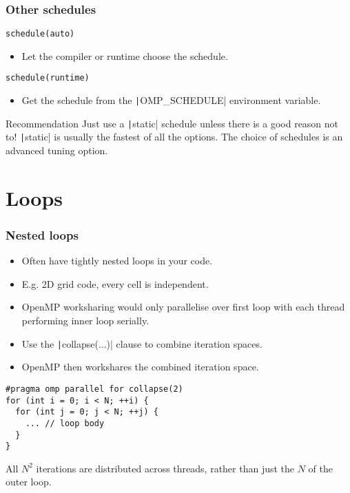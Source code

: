 \documentclass{beamer}
\begin{document}
\begin{frame}[fragile]
\frametitle{Other schedules}
\begin{verbatim}
schedule(auto)
\end{verbatim}
\begin{itemize}
  \item Let the compiler or runtime choose the schedule.
\end{itemize}

\vfill

\begin{verbatim}
schedule(runtime)
\end{verbatim}
\begin{itemize}
  \item Get the schedule from the \texttt|OMP_SCHEDULE| environment variable.
\end{itemize}

\begin{block}{Recommendation}
Just use a \texttt|static| schedule unless there is a good reason not to!
\texttt|static| is usually the fastest of all the options.
The choice of schedules is an advanced tuning option.
\end{block}

\end{frame}

\section{Loops}
\begin{frame}[fragile]
\frametitle{Nested loops}
\begin{itemize}
  \item Often have tightly nested loops in your code.
  \item E.g. 2D grid code, every cell is independent.
  \item OpenMP worksharing would only parallelise over first loop with each thread performing inner loop serially.
  \item Use the \texttt|collapse(...)| clause to combine iteration spaces.
  \item OpenMP then workshares the combined iteration space.
\end{itemize}

\begin{verbatim}
#pragma omp parallel for collapse(2)
for (int i = 0; i < N; ++i) {
  for (int j = 0; j < N; ++j) {
    ... // loop body
  }
}
\end{verbatim}
All $N^2$ iterations are distributed across threads, rather than just the $N$ of the outer loop.

\end{frame}
\end{document}

